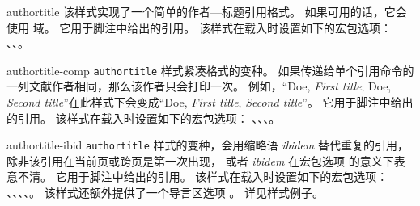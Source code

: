 \begin{marglist}
\item[authortitle]
该样式实现了一个简单的作者---标题引用格式。
如果可用的话，它会使用  域。
它用于脚注中给出的引用。
该样式在载入时设置如下的宏包选项：
、、。

\item[authortitle-comp]
\texttt{authortitle} 样式紧凑格式的变种。
如果传递给单个引用命令的一列文献作者相同，那么该作者只会打印一次。
例如，“Doe, \emph{First title}; Doe, \emph{Second title}”在此样式下会变成“Doe, \emph{First title}, \emph{Second title}”。
它用于脚注中给出的引用。
该样式在载入时设置如下的宏包选项：
、、、。

\item[authortitle-ibid]
\texttt{authortitle} 样式的变种，会用缩略语 \emph{ibidem} 替代重复的引用，
除非该引用在当前页或跨页是第一次出现，
或者 \emph{ibidem} 在宏包选项  的意义下表意不清。
它用于脚注中给出的引用。
该样式在载入时设置如下的宏包选项：
、、、、。
该样式还额外提供了一个导言区选项 。
详见样式例子。


\end{marglist}
